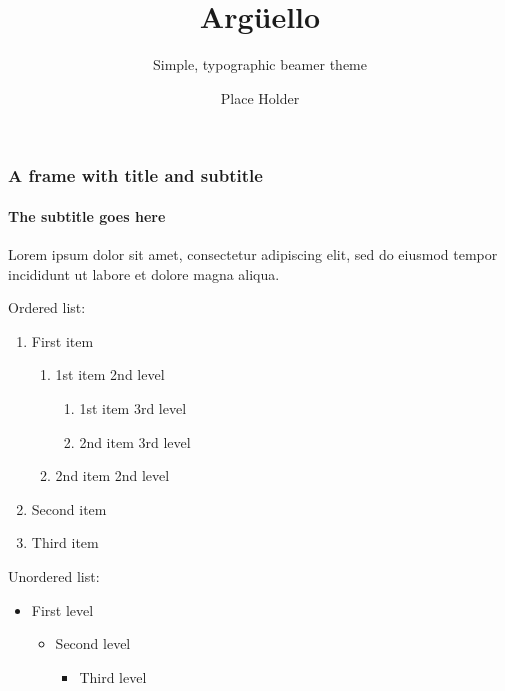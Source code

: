 \documentclass{beamer}
\title{Argüello}
\subtitle{Simple, typographic beamer theme}
\date{}
\author{Place Holder}
\institute{University of \TeX\par\email{username@domain.com}}
\begin{document}


\begin{frame}
      \frametitle{A frame with title and subtitle}
      \framesubtitle{The subtitle goes here}
      Lorem ipsum dolor sit amet, consectetur adipiscing elit, sed do eiusmod tempor incididunt ut labore et dolore magna aliqua.\par
      \vfill
      Ordered list:
      \begin{enumerate}
            \item First item
                  \begin{enumerate}
                        \item 1st item 2nd level
                              \begin{enumerate}
                                    \item 1st item 3rd level
                                    \item 2nd item 3rd level
                              \end{enumerate}
                        \item 2nd item 2nd level
                  \end{enumerate}
            \item Second item
            \item Third item
      \end{enumerate}
      \vfill
      Unordered list:
      \begin{itemize}
            \item First level
                  \begin{itemize}
                        \item Second level
                              \begin{itemize}
                                    \item Third level
                              \end{itemize}
                  \end{itemize}
      \end{itemize}
\end{frame}
\end{document}
